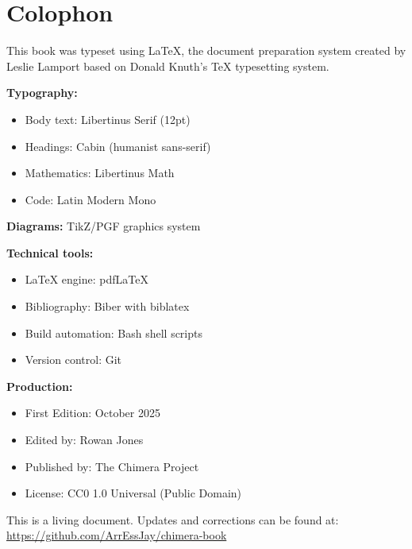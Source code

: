 \documentclass[12pt,a4paper,oneside]{book}
\begin{document}


\mainmatter



% 
% 
% 

\backmatter

\printbibliography[heading=bibintoc,title={Bibliography}]

\printindex

\chapter*{Colophon}

This book was typeset using \LaTeX{}, the document preparation system created by Leslie Lamport based on Donald Knuth's \TeX{} typesetting system.

\textbf{Typography:}
\begin{itemize}
\item Body text: Libertinus Serif (12pt)
\item Headings: Cabin (humanist sans-serif)
\item Mathematics: Libertinus Math
\item Code: Latin Modern Mono
\end{itemize}

\textbf{Diagrams:} TikZ/PGF graphics system

\textbf{Technical tools:}
\begin{itemize}
\item \LaTeX{} engine: pdf\LaTeX{}
\item Bibliography: Biber with biblatex
\item Build automation: Bash shell scripts
\item Version control: Git
\end{itemize}

\textbf{Production:}
\begin{itemize}
\item First Edition: October 2025
\item Edited by: Rowan Jones
\item Published by: The Chimera Project
\item License: CC0 1.0 Universal (Public Domain)
\end{itemize}

This is a living document. Updates and corrections can be found at:\\
\url{https://github.com/ArrEssJay/chimera-book}
\end{document}
